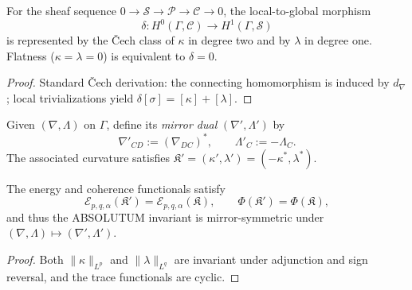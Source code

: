 
\begin{proposition}\label{prop:local-exactness}
For the sheaf sequence $0\to\mathcal S\to\mathcal P\to\mathcal C\to0$,
the local-to-global morphism
\[
\delta:H^0(\Gamma,\mathcal C)\longrightarrow H^1(\Gamma,\mathcal S)
\]
is represented by the Čech class of $\kappa$ in degree two and by $\lambda$ in degree one.
Flatness ($\kappa=\lambda=0$) is equivalent to $\delta=0$.
\end{proposition}

\begin{proof}
Standard Čech derivation: the connecting homomorphism is induced by $d_\nabla$; local trivializations yield $\delta[\sigma]=[\kappa]+[\lambda]$. \relax
\end{proof}


\begin{definition}\label{def:mirror-connection}
Given $(\nabla,\Lambda)$ on $\Gamma$, define its \emph{mirror dual} $(\nabla',\Lambda')$ by
\[
\nabla'_{CD}:=(\nabla_{DC})^*,\qquad \Lambda'_C:=-\Lambda_C.
\]
The associated curvature satisfies $\mathfrak K'=(\kappa',\lambda')=(-\kappa^*,\lambda^*)$.
\end{definition}

\begin{theorem}\label{thm:mirror-symmetry}
The energy and coherence functionals satisfy
\[
\mathcal E_{p,q,\alpha}(\mathfrak K')=\mathcal E_{p,q,\alpha}(\mathfrak K),\qquad
\Phi(\mathfrak K')=\Phi(\mathfrak K),
\]
and thus the ABSOLUTUM invariant is mirror-symmetric under $(\nabla,\Lambda)\mapsto(\nabla',\Lambda')$.
\end{theorem}

\begin{proof}
Both $\|\kappa\|_{L^p}$ and $\|\lambda\|_{L^q}$ are invariant under adjunction and sign reversal, and the trace functionals are cyclic. \relax
\end{proof}


